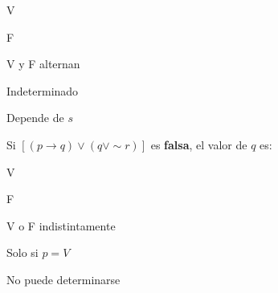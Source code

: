 \begin{multicols}{2}
		\begin{alternativas}
			\item V
			\item F
			\item V y F alternan
			\item Indeterminado
			\item Depende de $s$
		\end{alternativas}
		\vspace{0.3cm}
		
		\ejercicio Si $[(p \to q) \vee (q \vee \sim r)]$ es \textbf{falsa},
		el valor de $q$ es:
		
		\begin{alternativas}
			\item V
			\item F
			\item V o F indistintamente
			\item Solo si $p = V$
			\item No puede determinarse
		\end{alternativas}
		
	\end{multicols}
	
	\vspace{0.3cm}
	
	\begin{tcolorbox}[
		enhanced, colback=NaranjaSuave!60, colframe=NaranjaTierra,
		arc=2pt, boxrule=0.5pt, fonttitle=\sffamily\bfseries\small,
		title={Nivel Avanzado --- Tipo Admisión}, left=4pt, right=4pt, top=3pt, bottom=3pt
		]
	\end{tcolorbox}
	
